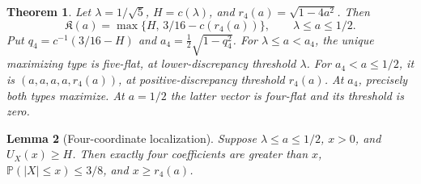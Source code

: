 \documentclass[11pt]{article}
\newtheorem{theorem}{Theorem}[section]
\newtheorem{lemma}[theorem]{Lemma}
\theoremstyle{remark}\newtheorem{remark}[theorem]{Remark}
\newcommand{\Pp}{\mathbb P}
\begin{document}
\begin{theorem}\label{thm:full-five-half}
Let $\lambda=1/\sqrt5$, $H=c(\lambda)$, and
$r_4(a)=\sqrt{1-4a^2}$. Then
\begin{equation}\label{eq:full-five-half}
 \mathfrak K(a)=\max\{H,\,3/16-c(r_4(a))\},
 \qquad \lambda\le a\le1/2.
\end{equation}
Put $q_4=c^{-1}(3/16-H)$ and $a_4=\frac12\sqrt{1-q_4^2}$.
For $\lambda\le a<a_4$, the unique maximizing type is five-flat,
at lower-discrepancy threshold $\lambda$. For $a_4<a\le1/2$,
it is $(a,a,a,a,r_4(a))$, at positive-discrepancy threshold $r_4(a)$.
At $a_4$, precisely both types maximize. At $a=1/2$ the latter
vector is four-flat and its threshold is zero.
\end{theorem}

\begin{lemma}[Four-coordinate localization]\label{lem:four-core-localization}
Suppose $\lambda\le a\le1/2$, $x>0$, and $U_X(x)\ge H$.
Then exactly four coefficients are greater than $x$,
$\Pp(|X|\le x)\le3/8$, and $x\ge r_4(a)$.
\end{lemma}
\end{document}
